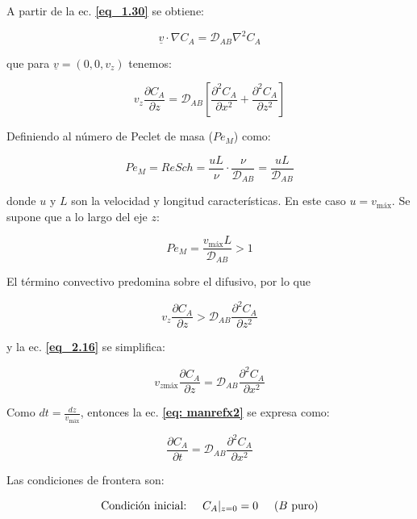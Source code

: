A partir de la ec. \textbf{\eqref{eq_1.30}} se obtiene:

$$	\underline{v} \cdot \nabla C_A = \mathscr{D}_{AB} \nabla^2 C_A $$

que para $\underline{v} = (0, 0, v_z)$ tenemos:

\begin{equation} \label{eq_2.16}
	v_z \frac{\partial C_A}{\partial z} = \mathscr{D}_{AB} \left[ \frac{\partial^2 C_A}{\partial x^2} + \frac{\partial^2 C_A}{\partial z^2}  \right]
\end{equation}

Definiendo al número de Peclet de masa ($Pe_M$) como: 

\begin{equation}
	Pe_M = Re Sch = \frac{uL}{\nu} \cdot \frac{\nu}{\mathscr{D}_{AB}} = \frac{uL}{\mathscr{D}_{AB}}
\end{equation}

donde $u$ y $L$ son la velocidad y longitud características. En este caso $u = v_{\text{máx}}$. Se supone que a lo largo del eje $z$:

$$Pe_M = \frac{v_{\text{máx}} L}{\mathscr{D}_{AB}} > 1$$

El término convectivo predomina sobre el difusivo, por lo que

$$v_z \frac{\partial C_A}{\partial z} > \mathscr{D}_{AB} \frac{\partial^2 C_A}{\partial z^2}$$

y la ec. \textbf{\eqref{eq_2.16}} se simplifica:

\begin{equation} \label{eq: manrefx2}
v_{z \text{máx}} \frac{\partial C_A}{\partial z} = \mathscr{D}_{AB} \frac{\partial^2 C_A}{\partial x^2}
\end{equation}

Como $dt = \frac{dz}{v_{\text{máx}}}$, entonces la ec. \textbf{\eqref{eq: manrefx2}} se expresa como:

\begin{equation} \label{eq: manrefx3}
	\frac{\partial C_A}{\partial t} = \mathscr{D}_{AB} \frac{\partial^2 C_A}{\partial x^2}
\end{equation}

Las condiciones de frontera son:

\begin{equation}
	\text{Condición inicial:} \hspace{0.5cm} C_A|_{z=0} = 0 \hspace{0.5cm} \text{($B$ puro)}
\end{equation}

